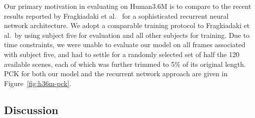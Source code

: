 \documentclass[runningheads]{llncs}
\begin{document}
Our primary motivation in evaluating on Human3.6M is to compare to the recent
results reported by Fragkiadaki et al.~\cite{fragkiadaki2015recurrent} for a
sophisticated recurrent neural network architecture. We adopt a comparable
training protocol to Fragkiadaki et al.\ by using subject five for evaluation and
all other subjects for training. Due to time constraints, we were unable to
evaluate our model on all frames associated with subject five, and had to settle
for a randomly selected set of half the 120 available scenes, each of which was
further trimmed to 5\% of its original length. PCK for both our model and the
recurrent network approach are given in Figure~\ref{fig:h36m-pck}.

\subsection{Discussion}\label{sec:discussion}

\end{document}
